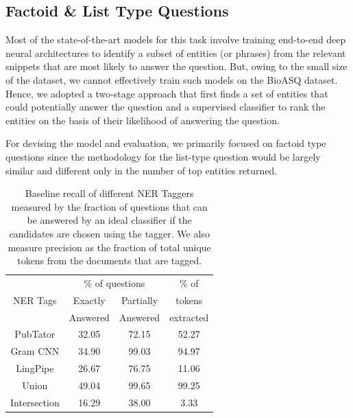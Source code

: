 \subsection{Factoid \& List Type Questions}

Most of the state-of-the-art models for this task involve training end-to-end deep neural architectures to identify a subset of entities (or phrases) from the relevant snippets that are most likely to answer the question. But, owing to the small size of the dataset, we cannot effectively train such models on the BioASQ dataset. Hence, we adopted a two-stage approach that first finds a set  of entities that could potentially answer the question and a supervised classifier to rank the entities on the basis of their likelihood of answering the question.

For devising the model and evaluation, we primarily focused on factoid type questions since the methodology for the list-type question would be largely similar and different only in the number of top entities returned. 


\begin{table}[h]
    \centering
    \begin{tabular}{cccc} \hline
    \multirow{3}{*}{NER Tags} & 
    \multicolumn{2}{c}{\% of questions} & 
     \% of \\
    & Exactly & Partially & tokens \\
    & Answered & Answered & extracted \\ \hline
    PubTator & 32.05 &	72.15 & 52.27 \\
    Gram CNN & 34.90 &	99.03 & 94.97 \\
    LingPipe & 26.67 &	76.75 & 11.06 \\
    Union    & 49.04 &	99.65 & 99.25 \\
    Intersection & 16.29 &	38.00 & 3.33 \\ \hline
    \end{tabular}
    \caption{Baseline recall of different NER Taggers measured by the fraction of questions that can be answered by an ideal classifier if the candidates are chosen using the tagger. We also measure precision as the fraction of total unique tokens from the documents that are tagged.}
    \label{tab:NER_tagging_performances}
\end{table}

